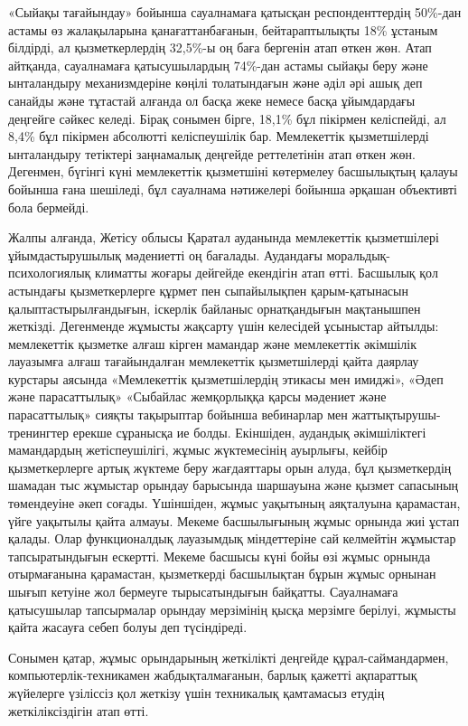 \begin{multicols}{2}
«Сыйақы тағайындау» бойынша сауалнамаға қатысқан респонденттердің
50\%-дан астамы өз жалақыларына қанағаттанбағанын, бейтараптылықты 18\%
ұстаным білдірді, ал қызметкерлердің 32,5\%-ы оң баға бергенін атап
өткен жөн. Атап айтқанда, сауалнамаға қатысушылардың 74\%-дан астамы
сыйақы беру және ынталандыру механизмдеріне көңілі толатындағын және
әділ әрі ашық деп санайды және тұтастай алғанда ол басқа жеке немесе
басқа ұйымдардағы деңгейге сәйкес келеді. Бірақ сонымен бірге, 18,1\%
бұл пікірмен келіспейді, ал 8,4\% бұл пікірмен абсолютті келіспеушілік
бар. Мемлекеттік қызметшілерді ынталандыру тетіктері заңнамалық деңгейде
реттелетінін атап өткен жөн. Дегенмен, бүгінгі күні мемлекеттік
қызметшіні көтермелеу басшылықтың қалауы бойынша ғана шешіледі, бұл
сауалнама нәтижелері бойынша әрқашан объективті бола бермейді.

Жалпы алғанда, Жетісу облысы Қаратал ауданында мемлекеттік қызметшілері
ұйымдастырушылық мәдениетті оң бағалады. Аудандағы
моральдық-психологиялық климатты жоғары дейгейде екендігін атап өтті.
Басшылық қол астындағы қызметкерлерге құрмет пен сыпайылықпен
қарым-қатынасын қалыптастырылғандығын, іскерлік байланыс орнатқандығын
мақтанышпен жеткізді. Дегенменде жұмысты жақсарту үшін келесідей
ұсыныстар айтылды: мемлекеттік қызметке алғаш кірген мамандар және
мемлекеттік әкімшілік лауазымға алғаш тағайындалған мемлекеттік
қызметшілерді қайта даярлау курстары аясында «Мемлекеттік қызметшілердің
этикасы мен имиджі», «Әдеп және парасаттылық» «Сыбайлас жемқорлыққа
қарсы мәдениет және парасаттылық» сияқты тақырыптар бойынша вебинарлар
мен жаттықтырушы-тренингтер ерекше сұранысқа ие болды. Екіншіден,
аудандық әкімшіліктегі мамандардың жетіспеушілігі, жұмыс жүктемесінің
ауырлығы, кейбір қызметкерлерге артық жүктеме беру жағдаяттары орын
алуда, бұл қызметкердің шамадан тыс жұмыстар орындау барысында шаршауына
және қызмет сапасының төмендеуіне әкеп соғады. Үшіншіден, жұмыс
уақытының аяқталуына қарамастан, үйге уақытылы қайта алмауы. Мекеме
басшылығының жұмыс орнында жиі ұстап қалады. Олар функционалдық
лауазымдық міндеттеріне сай келмейтін жұмыстар тапсыратындығын ескертті.
Мекеме басшысы күні бойы өзі жұмыс орнында отырмағанына қарамастан,
қызметкерді басшылықтан бұрын жұмыс орнынан шығып кетуіне жол бермеуге
тырысатындығын байқатты. Сауалнамаға қатысушылар тапсырмалар орындау
мерзімінің қысқа мерзімге берілуі, жұмысты қайта жасауға себеп болуы деп
түсіндіреді.

Сонымен қатар, жұмыс орындарының жеткілікті деңгейде құрал-саймандармен,
компьютерлік-техникамен жабдықталмағанын, барлық қажетті ақпараттық
жүйелерге үзіліссіз қол жеткізу үшін техникалық қамтамасыз етудің
жеткіліксіздігін атап өтті.


\end{multicols}
